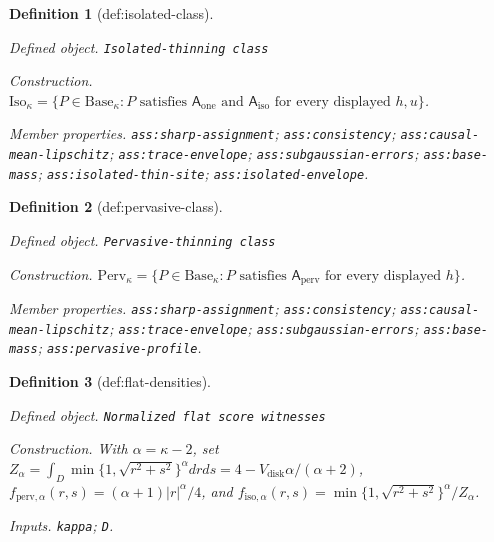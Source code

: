 \documentclass{article}
\newtheorem{definition}{Definition}
\begin{document}
\begin{definition}[def:isolated-class]\label{def:isolated-class}
\par\smallskip\noindent\emph{Defined object.} \texttt{Isolated-\allowbreak{}thinning class}
\par\smallskip\noindent\emph{Construction.} \(\mathrm{Iso}_\kappa=\{P\in\mathrm{Base}_\kappa:P\text{ satisfies }\mathsf A_{\mathrm{one}}\text{ and }\mathsf A_{\mathrm{iso}}\text{ for every displayed }h,u\}\).
\par\smallskip\noindent\emph{Member properties.} \texttt{ass:\allowbreak{}sharp-\allowbreak{}assignment}; \texttt{ass:\allowbreak{}consistency}; \texttt{ass:\allowbreak{}causal-\allowbreak{}mean-\allowbreak{}lipschitz}; \texttt{ass:\allowbreak{}trace-\allowbreak{}envelope}; \texttt{ass:\allowbreak{}subgaussian-\allowbreak{}errors}; \texttt{ass:\allowbreak{}base-\allowbreak{}mass}; \texttt{ass:\allowbreak{}isolated-\allowbreak{}thin-\allowbreak{}site}; \texttt{ass:\allowbreak{}isolated-\allowbreak{}envelope}.
\end{definition}

\begin{definition}[def:pervasive-class]\label{def:pervasive-class}
\par\smallskip\noindent\emph{Defined object.} \texttt{Pervasive-\allowbreak{}thinning class}
\par\smallskip\noindent\emph{Construction.} \(\mathrm{Perv}_\kappa=\{P\in\mathrm{Base}_\kappa:P\text{ satisfies }\mathsf A_{\mathrm{perv}}\text{ for every displayed }h\}\).
\par\smallskip\noindent\emph{Member properties.} \texttt{ass:\allowbreak{}sharp-\allowbreak{}assignment}; \texttt{ass:\allowbreak{}consistency}; \texttt{ass:\allowbreak{}causal-\allowbreak{}mean-\allowbreak{}lipschitz}; \texttt{ass:\allowbreak{}trace-\allowbreak{}envelope}; \texttt{ass:\allowbreak{}subgaussian-\allowbreak{}errors}; \texttt{ass:\allowbreak{}base-\allowbreak{}mass}; \texttt{ass:\allowbreak{}pervasive-\allowbreak{}profile}.
\end{definition}

\begin{definition}[def:flat-densities]\label{def:flat-densities}
\par\smallskip\noindent\emph{Defined object.} \texttt{Normalized flat score witnesses}
\par\smallskip\noindent\emph{Construction.} With \(\alpha=\kappa-2\), set \(Z_\alpha=\int_D\min\{1,\sqrt{r^2+s^2}\}^{\alpha}drds=4-V_{\mathrm{disk}}\alpha/(\alpha+2)\), \(f_{\mathrm{perv},\alpha}(r,s)=(\alpha+1)|r|^\alpha/4\), and \(f_{\mathrm{iso},\alpha}(r,s)=\min\{1,\sqrt{r^2+s^2}\}^{\alpha}/Z_\alpha\).
\par\smallskip\noindent\emph{Inputs.} \texttt{kappa}; \texttt{D}.
\end{definition}
\end{document}
